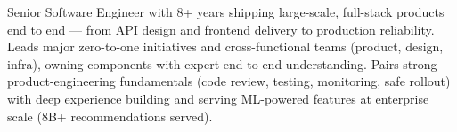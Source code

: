 
\begin{cvparagraph}
Senior Software Engineer with 8+ years shipping large-scale, full-stack products end to end --- from API design and frontend delivery to production reliability. Leads major zero-to-one initiatives and cross-functional teams (product, design, infra), owning components with expert end-to-end understanding. Pairs strong product-engineering fundamentals (code review, testing, monitoring, safe rollout) with deep experience building and serving ML-powered features at enterprise scale (8B+ recommendations served).
\end{cvparagraph}

